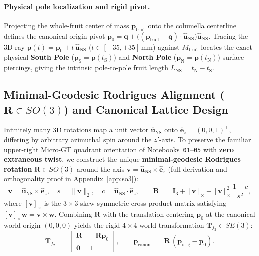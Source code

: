 \documentclass[10pt,a4paper]{article}
\renewcommand{\_}{\origunderscore\allowbreak}
\begin{document}
\paragraph{Physical pole localization and rigid pivot.}
Projecting the whole-fruit center of mass $\mathbf{p}_{\text{fruit}}$ onto the columella centerline defines the canonical origin pivot $\mathbf{p}_0 = \bar{\mathbf{q}} + \bigl((\mathbf{p}_{\text{fruit}} - \bar{\mathbf{q}})\cdot \hat{\mathbf{u}}_{\text{NS}}\bigr)\hat{\mathbf{u}}_{\text{NS}}$. Tracing the 3D ray $\mathbf{p}(t) = \mathbf{p}_0 + t\,\hat{\mathbf{u}}_{\text{NS}}$ ($t \in [-35, +35]\,\text{mm}$) against $M_{\text{fruit}}$ locates the exact physical \textbf{South Pole} ($\mathbf{p}_{\text{S}} = \mathbf{p}(t_{\text{S}})$) and \textbf{North Pole} ($\mathbf{p}_{\text{N}} = \mathbf{p}(t_{\text{N}})$) surface piercings, giving the intrinsic pole-to-pole fruit length $L_{\text{NS}} = t_{\text{N}} - t_{\text{S}}$.

\subsection{Minimal-Geodesic Rodrigues Alignment ($\mathbf{R} \in SO(3)$) and Canonical Lattice Design}
\label{sec:meth_rodrigues}

Infinitely many 3D rotations map a unit vector $\hat{\mathbf{u}}_{\text{NS}}$ onto $\hat{\mathbf{e}}_z = (0, 0, 1)^\top$, differing by arbitrary azimuthal spin around the $z'$-axis. To preserve the familiar upper-right Micro-GT quadrant orientation of Notebooks~\texttt{01}--\texttt{05} with \textbf{zero extraneous twist}, we construct the unique \textbf{minimal-geodesic Rodrigues rotation} $\mathbf{R} \in SO(3)$ around the axis $\mathbf{v} = \hat{\mathbf{u}}_{\text{NS}} \times \hat{\mathbf{e}}_z$ (full derivation and orthogonality proof in Appendix~\ref{app:so3}):
\begin{equation}
    \mathbf{v} = \hat{\mathbf{u}}_{\text{NS}} \times \hat{\mathbf{e}}_z,\quad
    s = \|\mathbf{v}\|_2,\quad
    c = \hat{\mathbf{u}}_{\text{NS}} \cdot \hat{\mathbf{e}}_z,\qquad
    \mathbf{R} \;=\; \mathbf{I}_3 + [\mathbf{v}]_\times + [\mathbf{v}]_\times^2\,\frac{1 - c}{s^2},
    \label{eq:rodrigues}
\end{equation}
where $[\mathbf{v}]_\times$ is the $3\times 3$ skew-symmetric cross-product matrix satisfying $[\mathbf{v}]_\times \mathbf{w} = \mathbf{v} \times \mathbf{w}$. Combining $\mathbf{R}$ with the translation centering $\mathbf{p}_0$ at the canonical world origin $(0,0,0)$ yields the rigid $4\times 4$ world transformation $\mathbf{T}_{f_2} \in SE(3)$:
\begin{equation}
    \mathbf{T}_{f_2} \;=\; \begin{bmatrix} \mathbf{R} & -\mathbf{R}\mathbf{p}_0 \\ \mathbf{0}^\top & 1 \end{bmatrix},
    \qquad
    \mathbf{p}_{\text{canon}} \;=\; \mathbf{R}\,(\mathbf{p}_{\text{orig}} - \mathbf{p}_0).
    \label{eq:tf2}
\end{equation}
\end{document}
